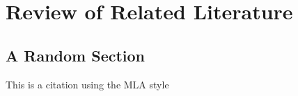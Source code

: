 \chapter{Review of Related Literature}

\section{A Random Section}

This is a citation using the MLA style %



